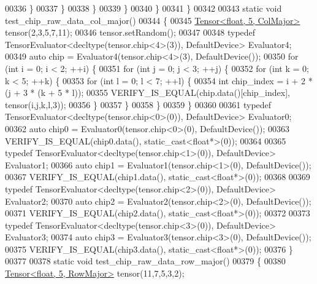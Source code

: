 \begin{DoxyCode}
00336           \}
00337         \}
00338       \}
00339     \}
00340   \}
00341 \}
00342 
00343 \textcolor{keyword}{static} \textcolor{keywordtype}{void} test\_chip\_raw\_data\_col\_major()
00344 \{
00345   \hyperlink{class_eigen_1_1_tensor}{Tensor<float, 5, ColMajor>} tensor(2,3,5,7,11);
00346   tensor.setRandom();
00347 
00348   \textcolor{keyword}{typedef} TensorEvaluator<decltype(tensor.chip<4>(3)), DefaultDevice> Evaluator4;
00349   \textcolor{keyword}{auto} chip = Evaluator4(tensor.chip<4>(3), DefaultDevice());
00350   \textcolor{keywordflow}{for} (\textcolor{keywordtype}{int} i = 0; i < 2; ++i) \{
00351     \textcolor{keywordflow}{for} (\textcolor{keywordtype}{int} j = 0; j < 3; ++j) \{
00352       \textcolor{keywordflow}{for} (\textcolor{keywordtype}{int} k = 0; k < 5; ++k) \{
00353         \textcolor{keywordflow}{for} (\textcolor{keywordtype}{int} l = 0; l < 7; ++l) \{
00354           \textcolor{keywordtype}{int} chip\_index = i + 2 * (j + 3 * (k + 5 * l));
00355           VERIFY\_IS\_EQUAL(chip.data()[chip\_index], tensor(i,j,k,l,3));
00356         \}
00357       \}
00358     \}
00359   \}
00360 
00361   \textcolor{keyword}{typedef} TensorEvaluator<decltype(tensor.chip<0>(0)), DefaultDevice> Evaluator0;
00362   \textcolor{keyword}{auto} chip0 = Evaluator0(tensor.chip<0>(0), DefaultDevice());
00363   VERIFY\_IS\_EQUAL(chip0.data(), \textcolor{keyword}{static\_cast<}\textcolor{keywordtype}{float}*\textcolor{keyword}{>}(0));
00364 
00365   \textcolor{keyword}{typedef} TensorEvaluator<decltype(tensor.chip<1>(0)), DefaultDevice> Evaluator1;
00366   \textcolor{keyword}{auto} chip1 = Evaluator1(tensor.chip<1>(0), DefaultDevice());
00367   VERIFY\_IS\_EQUAL(chip1.data(), \textcolor{keyword}{static\_cast<}\textcolor{keywordtype}{float}*\textcolor{keyword}{>}(0));
00368 
00369   \textcolor{keyword}{typedef} TensorEvaluator<decltype(tensor.chip<2>(0)), DefaultDevice> Evaluator2;
00370   \textcolor{keyword}{auto} chip2 = Evaluator2(tensor.chip<2>(0), DefaultDevice());
00371   VERIFY\_IS\_EQUAL(chip2.data(), \textcolor{keyword}{static\_cast<}\textcolor{keywordtype}{float}*\textcolor{keyword}{>}(0));
00372 
00373   \textcolor{keyword}{typedef} TensorEvaluator<decltype(tensor.chip<3>(0)), DefaultDevice> Evaluator3;
00374   \textcolor{keyword}{auto} chip3 = Evaluator3(tensor.chip<3>(0), DefaultDevice());
00375   VERIFY\_IS\_EQUAL(chip3.data(), \textcolor{keyword}{static\_cast<}\textcolor{keywordtype}{float}*\textcolor{keyword}{>}(0));
00376 \}
00377 
00378 \textcolor{keyword}{static} \textcolor{keywordtype}{void} test\_chip\_raw\_data\_row\_major()
00379 \{
00380   \hyperlink{class_eigen_1_1_tensor}{Tensor<float, 5, RowMajor>} tensor(11,7,5,3,2);

\end{DoxyCode}
